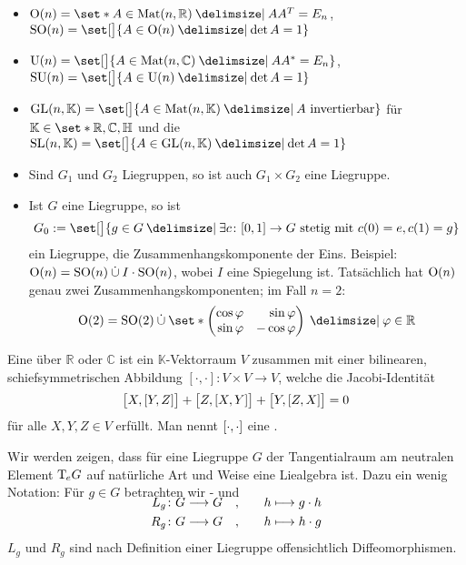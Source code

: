 \begin{beispiel*}[{name=[{Liegruppen}]}]
\begin{itemize}
		\emph{In Übungsaufgabe 3 werden diese Behauptungen bewiesen.}
		\item {} $\On(n) = \set*{A \in \Mat(n,\mathbb{R}) \given A A^T = E_n}$, $\SO(n) = \set[\big]{A \in \On(n) \given \det A=1}$
		\item {} $\Un(n) = \set[\big]{A \in \Mat (n,\mathbb{C}) \given A A^* =E_n}$, $\SU(n) = \set[\big]{A \in \Un(n) \given \det A=1}$
		\item {} $\GL(n,\mathbb{K}) = \set[\big]{A \in \Mat(n,\mathbb{K}) \given A \text{ invertierbar}}$ für $\mathbb{K} \in  \set*{\mathbb{R},\mathbb{C},\mathbb{H}}$ und die 
		$\SL(n,\mathbb{K}) = \set[\big]{A \in \GL(n,\mathbb{K}) \given \det A =1}$
		\item Sind $G_1$ und $G_2$ Liegruppen, so ist auch $G_1 \times G_2$ eine Liegruppe.
		\item Ist $G$ eine Liegruppe, so ist
		\[
			G_0 :=  \set[\big]{g \in G \given \exists c \colon [0,1] \to G \text{ stetig mit } c(0)=e, c(1)=g}
		\]
		ein Liegruppe, die Zusammenhangskomponente der Eins.
		Beispiel: $\On(n)=\SO(n) \mathbin{\dot{\cup}} I \cdot \SO(n)$, wobei $I$ eine Spiegelung ist.
		Tatsächlich hat $\On(n)$ genau zwei Zusammenhangskomponenten; im Fall $n=2$:
		\[
			\On(2) = \SO(2) \mathbin{\dot{\cup}} \set*{\begin{pmatrix*}[r]
				\cos \varphi & \sin \varphi \\
				\sin \varphi & - \cos \varphi
			\end{pmatrix*} \given \varphi \in \mathbb{R}}
		\]
	\end{itemize}
\end{beispiel*}

\begin{definition}[{name=[Liealgebra und Lieklammer]}]
	Eine  über $\mathbb{R}$ oder $\mathbb{C}$ ist ein $\mathbb{K}$-Vektorraum $V$ zusammen mit einer bilinearen, schiefsymmetrischen Abbildung 
	\(
		[\cdot ,\cdot ] \colon V \times V \to V
	\),
	welche die Jacobi-Identität 
	\[
		\benbrace[\big]{X, \benbrace*{Y,Z}} + \benbrace[\big]{Z, \benbrace*{X,Y}} + \benbrace[\big]{Y, \benbrace*{Z,X}} =0
	\]
	für alle $X,Y,Z \in V$ erfüllt.
	Man nennt $\benbrace*{\cdot ,\cdot }$ eine . 
\end{definition}

Wir werden zeigen, dass für eine Liegruppe $G$ der Tangentialraum am neutralen Element $\Tmap_e G$ auf natürliche Art und Weise eine Liealgebra ist.
Dazu ein wenig Notation: Für $g \in G$ betrachten wir - und 
\begin{align}
	\SwapAboveDisplaySkip
	L_g \colon G \longrightarrow G \quad , \qquad &h \longmapsto g \cdot h \\
	R_g \colon G \longrightarrow G \quad , \qquad &h \longmapsto h \cdot g
\end{align}
$L_g$ und $R_g$ sind nach Definition einer Liegruppe offensichtlich Diffeomorphismen.

